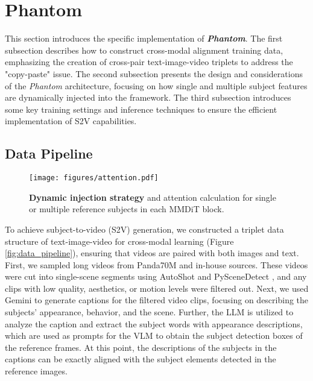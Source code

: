 \section{Phantom}
\label{sec:phantom}

This section introduces the specific implementation of \textbf{\textit{Phantom}}. The first subsection describes how to construct cross-modal alignment training data, emphasizing the creation of cross-pair text-image-video triplets to address the "copy-paste" issue. The second subsection presents the design and considerations of the \textit{Phantom} architecture, focusing on how single and multiple subject features are dynamically injected into the framework. The third subsection introduces some key training settings and inference techniques to ensure the efficient implementation of S2V capabilities.

\subsection{Data Pipeline}
\label{sec:method:data_pipeline}

\begin{figure}[t]
	\centering
	\texttt{[image: figures/attention.pdf]} 
	\caption{\textbf{Dynamic injection strategy} and attention calculation for single or multiple reference subjects in each MMDiT block.}
	\label{fig:attention}
\end{figure}

To achieve subject-to-video (S2V) generation, we constructed a triplet data structure of text-image-video for cross-modal learning (Figure \ref{fig:data_pipeline}), ensuring that videos are paired with both images and text. 
First, we sampled long videos from Panda70M \cite{chen2024panda70m} and in-house sources. These videos were cut into single-scene segments using AutoShot \cite{zhu2023autoshot} and PySceneDetect \cite{pyscenedetect}, and any clips with low quality, aesthetics, or motion levels were filtered out.
Next, we used Gemini \cite{team2023gemini} to generate captions for the filtered video clips, focusing on describing the subjects' appearance, behavior, and the scene. 
Further, the LLM \cite{GPT4} is utilized to analyze the caption and extract the subject words with appearance descriptions, which are used as prompts for the VLM \cite{Qwen2.5-VL} to obtain the subject detection boxes of the reference frames.
At this point, the descriptions of the subjects in the captions can be exactly aligned with the subject elements detected in the reference images.

